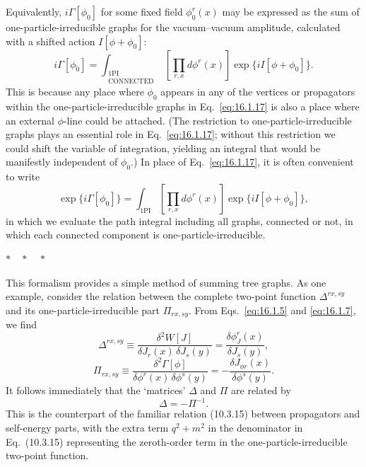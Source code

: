 Equivalently, $i\Gamma[\phi_0]$ for some fixed field $\phi_0^r(x)$ may be expressed as the
sum of one-particle-irreducible graphs for the vacuum--vacuum amplitude,
calculated with a shifted action $I[\phi+\phi_0]$:
\begin{equation}
i\Gamma[\phi_0]=\int_{\substack{\mathrm{1PI}\\\mathrm{CONNECTED}}}
\left[\prod_{r,x}d\phi^r(x)\right]\exp\{iI[\phi+\phi_0]\}.
\label{eq:16.1.17}
\end{equation}
This is because any place where $\phi_0$ appears in any of the vertices or
propagators within the one-particle-irreducible graphs in Eq.\ \eqref{eq:16.1.17} is
also a place where an external $\phi$-line could be attached. (The restriction
to one-particle-irreducible graphs plays an essential role in Eq.\ \eqref{eq:16.1.17};
without this restriction we could shift the variable of integration, yielding
an integral that would be manifestly independent of $\phi_0$.) In place of
Eq.\ \eqref{eq:16.1.17}, it is often convenient to write
\begin{equation}
\exp\{i\Gamma[\phi_0]\}=\int_{\mathrm{1PI}}
\left[\prod_{r,x}d\phi^r(x)\right]\exp\{iI[\phi+\phi_0]\},
\label{eq:16.1.18}
\end{equation}
in which we evaluate the path integral including all graphs, connected or
not, in which each connected component is one-particle-irreducible.

\begin{center}
$*\quad*\quad*$
\end{center}

This formalism provides a simple method of summing tree graphs. As
one example, consider the relation between the complete two-point function
$\Delta^{rx,sy}$ and its one-particle-irreducible part $\Pi_{rx,sy}$. From Eqs.\ \eqref{eq:16.1.5}
and \eqref{eq:16.1.7}, we find
\begin{equation}
\Delta^{rx,sy}\equiv\frac{\delta^2W[J]}{\delta J_r(x)\,\delta J_s(y)}
=\frac{\delta\phi_J^r(x)}{\delta J_s(y)},
\label{eq:16.1.19}
\end{equation}
\begin{equation}
\Pi_{rx,sy}\equiv\frac{\delta^2\Gamma[\phi]}{\delta\phi^r(x)\,\delta\phi^s(y)}
=-\frac{\delta J_{\phi r}(x)}{\delta\phi^s(y)}.
\label{eq:16.1.20}
\end{equation}
It follows immediately that the `matrices' $\Delta$ and $\Pi$ are related by
\begin{equation}
\Delta=-\Pi^{-1}.
\label{eq:16.1.21}
\end{equation}
This is the counterpart of the familiar relation (10.3.15) between propagators
and self-energy parts, with the extra term $q^2+m^2$ in the denominator
in Eq.\ (10.3.15) representing the zeroth-order term in the
one-particle-irreducible two-point function.
